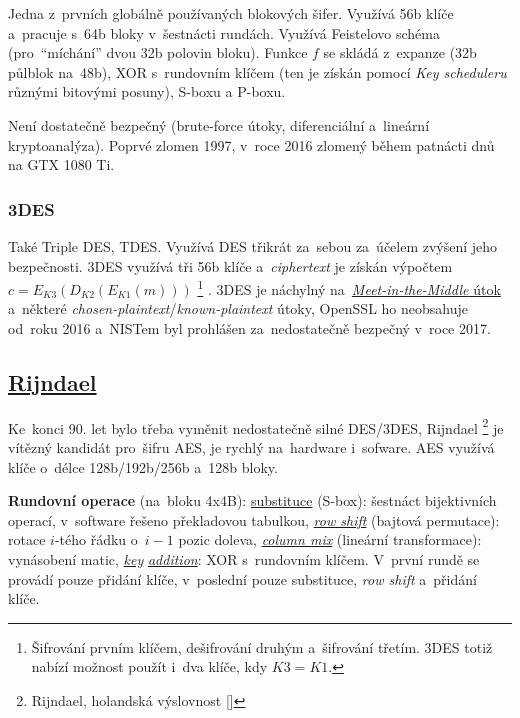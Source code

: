 Jedna z~prvních globálně používaných blokových šifer. Využívá 56b klíče a~pracuje s~64b bloky v~šestnácti rundách. Využívá Feistelovo schéma (pro~\enquote{míchání} dvou 32b polovin bloku). Funkce $f$ se skládá z~expanze (32b půlblok na~48b), XOR s~rundovním klíčem (ten je získán pomocí \emph{Key scheduleru} různými bitovými posuny), S-boxu a P-boxu.

Není dostatečně bezpečný (brute-force útoky, diferenciální a~lineární kryptoanalýza). Poprvé zlomen 1997, v~roce 2016 zlomený během patnácti dnů na GTX 1080 Ti.

\subsubsection{3DES}

Také Triple DES, TDES. Využívá DES třikrát za~sebou za~účelem zvýšení jeho bezpečnosti. 3DES využívá tři 56b klíče a~\emph{ciphertext} je získán výpočtem $c = E_{K3}(D_{K2}(E_{K1}(m)))$%
\footnote{Šifrování prvním klíčem, dešifrování druhým a~šifrování třetím. 3DES totiž nabízí možnost použít i~dva klíče, kdy $K3=K1$.}%
. 3DES je náchylný na~\href{https://en.wikipedia.org/wiki/Meet-in-the-middle_attack}{\emph{Meet-in-the-Middle} útok} a~některé \emph{chosen-plaintext}/\emph{known-plaintext} útoky, OpenSSL ho neobsahuje od~roku 2016 a~NISTem byl prohlášen za~nedostatečně bezpečný v~roce 2017.

\subsection{\href{https://en.wikipedia.org/wiki/Advanced_Encryption_Standard}{Rijndael}}

Ke~konci 90. let bylo třeba vyměnit nedostatečně silné DES/3DES, Rijndael%
\footnote{Rijndael, holandská výslovnost []}
je vítězný kandidát pro~šifru AES, je rychlý na~hardware i~sofware. AES využívá klíče o~délce 128b/192b/256b a~128b bloky.

\textbf{Rundovní operace} (na~bloku 4x4B): \underline{substituce} (S-box): šestnáct bijektivních operací, v~software řešeno překladovou tabulkou, \underline{\emph{row shift}} (bajtová permutace): rotace \mbox{$i$-tého} řádku o~$i-1$ pozic doleva, \underline{\emph{column mix}} (lineární transformace): vynásobení matic, \underline{\emph{key}} \underline{\emph{addition}}: XOR s~rundovním klíčem. V~první rundě se provádí pouze přidání klíče, v~poslední pouze substituce, \emph{row shift} a~přidání klíče.

